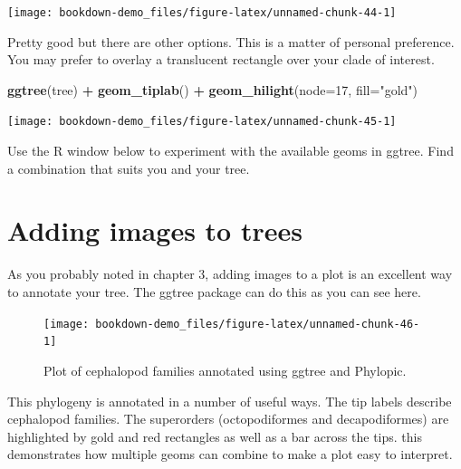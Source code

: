 \documentclass[
]{book}
\newenvironment{Shaded}{\begin{snugshade}}{\end{snugshade}}
\newcommand{\DataTypeTok}[1]{\textcolor[rgb]{0.13,0.29,0.53}{#1}}
\newcommand{\DecValTok}[1]{\textcolor[rgb]{0.00,0.00,0.81}{#1}}
\newcommand{\KeywordTok}[1]{\textcolor[rgb]{0.13,0.29,0.53}{\textbf{#1}}}
\newcommand{\NormalTok}[1]{#1}
\newcommand{\OperatorTok}[1]{\textcolor[rgb]{0.81,0.36,0.00}{\textbf{#1}}}
\newcommand{\StringTok}[1]{\textcolor[rgb]{0.31,0.60,0.02}{#1}}
\begin{document}
\begin{center}\texttt{[image: bookdown-demo\_files/figure-latex/unnamed-chunk-44-1]} \end{center}

Pretty good but there are other options. This is a matter of personal preference. You may prefer to overlay a translucent rectangle over your clade of interest.

\begin{Shaded}
\begin{Highlighting}[]
\KeywordTok{ggtree}\NormalTok{(tree) }\OperatorTok{+}\StringTok{ }
\StringTok{  }\KeywordTok{geom\_tiplab}\NormalTok{() }\OperatorTok{+}\StringTok{ }
\StringTok{  }\KeywordTok{geom\_hilight}\NormalTok{(}\DataTypeTok{node=}\DecValTok{17}\NormalTok{, }\DataTypeTok{fill=}\StringTok{"gold"}\NormalTok{)}
\end{Highlighting}
\end{Shaded}

\begin{center}\texttt{[image: bookdown-demo\_files/figure-latex/unnamed-chunk-45-1]} \end{center}

Use the R window below to experiment with the available geoms in ggtree. Find a combination that suits you and your tree.

\hypertarget{adding-images-to-trees}{%
\section{Adding images to trees}\label{adding-images-to-trees}}

As you probably noted in chapter 3, adding images to a plot is an excellent way to annotate your tree. The ggtree package can do this as you can see here.

\begin{figure}[H]

{\centering \texttt{[image: bookdown-demo\_files/figure-latex/unnamed-chunk-46-1]} 

}

\caption{Plot of cephalopod families annotated using ggtree and Phylopic.}\label{fig:unnamed-chunk-46}
\end{figure}

This phylogeny is annotated in a number of useful ways. The tip labels describe cephalopod families. The superorders (octopodiformes and decapodiformes) are highlighted by gold and red rectangles as well as a bar across the tips. this demonstrates how multiple geoms can combine to make a plot easy to interpret.
\end{document}
